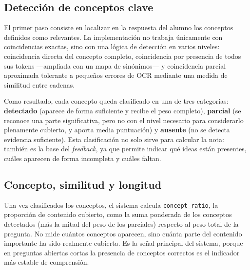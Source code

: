 \subsection{Detección de conceptos clave}

El primer paso consiste en localizar en la respuesta del alumno los conceptos definidos como relevantes. La implementación no trabaja únicamente con coincidencias exactas, sino con una lógica de detección en varios niveles: coincidencia directa del concepto completo, coincidencia por presencia de todos sus tokens —ampliada con un mapa de sinónimos— y coincidencia parcial aproximada tolerante a pequeños errores de OCR mediante una medida de similitud entre cadenas.

Como resultado, cada concepto queda clasificado en una de tres categorías: \textbf{detectado} (aparece de forma suficiente y recibe el peso completo), \textbf{parcial} (se reconoce una parte significativa, pero no con el nivel necesario para considerarlo plenamente cubierto, y aporta media puntuación) y \textbf{ausente} (no se detecta evidencia suficiente). Esta clasificación no solo sirve para calcular la nota: también es la base del \emph{feedback}, ya que permite indicar qué ideas están presentes, cuáles aparecen de forma incompleta y cuáles faltan.

\subsection{Concepto, similitud y longitud}

Una vez clasificados los conceptos, el sistema calcula \texttt{concept\_ratio}, la proporción de contenido cubierto, como la suma ponderada de los conceptos detectados (más la mitad del peso de los parciales) respecto al peso total de la pregunta. No mide cuántos conceptos aparecen, sino cuánta parte del contenido importante ha sido realmente cubierta. Es la señal principal del sistema, porque en preguntas abiertas cortas la presencia de conceptos correctos es el indicador más estable de comprensión.

